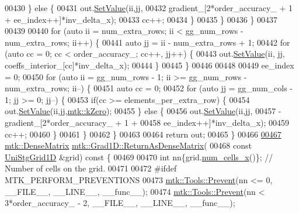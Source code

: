 \begin{DoxyCode}
{{00430       \} \textcolor{keywordflow}{else} \{
00431         out.\hyperlink{classmtk_1_1DenseMatrix_a784ce5784109ac86bfb9d8562b334b13}{SetValue}(ii,jj,
00432                      gradient\_[2*order\_accuracy\_ + 1 + ee\_index++]*inv\_delta\_x);
00433         cc++;
00434       \}
00435     \}
00436   \}
00437 
00439 
00440   \textcolor{keywordflow}{for} (\textcolor{keyword}{auto} ii = num\_extra\_rows; ii < gg\_num\_rows - num\_extra\_rows; ii++) \{
00441     \textcolor{keyword}{auto} jj = ii - num\_extra\_rows + 1;
00442     \textcolor{keywordflow}{for} (\textcolor{keyword}{auto} cc = 0; cc < order\_accuracy\_; cc++, jj++) \{
00443       out.\hyperlink{classmtk_1_1DenseMatrix_a784ce5784109ac86bfb9d8562b334b13}{SetValue}(ii, jj, coeffs\_interior\_[cc]*inv\_delta\_x);
00444     \}
00445   \}
00446 
00448 
00449   ee\_index = 0;
00450   \textcolor{keywordflow}{for} (\textcolor{keyword}{auto} ii = gg\_num\_rows - 1; ii >= gg\_num\_rows - num\_extra\_rows; ii--) \{
00451     \textcolor{keyword}{auto} cc = 0;
00452     \textcolor{keywordflow}{for} (\textcolor{keyword}{auto} jj = gg\_num\_cols - 1; jj >= 0; jj--) \{
00453       \textcolor{keywordflow}{if}(cc >= elements\_per\_extra\_row) \{
00454         out.\hyperlink{classmtk_1_1DenseMatrix_a784ce5784109ac86bfb9d8562b334b13}{SetValue}(ii,jj,\hyperlink{group__c01-roots_ga59a451a5fae30d59649bcda274fea271}{mtk::kZero});
00455       \} \textcolor{keywordflow}{else} \{
00456         out.\hyperlink{classmtk_1_1DenseMatrix_a784ce5784109ac86bfb9d8562b334b13}{SetValue}(ii,jj,
00457                      -gradient\_[2*order\_accuracy\_ + 1 +
00458 ee\_index++]*inv\_delta\_x);
00459         cc++;
00460       \}
00461      \}
00462   \}
00463 
00464   \textcolor{keywordflow}{return} out;
00465 \}
00466 
\hypertarget{mtk__grad__1d_8cc_source_l00467}{}\hyperlink{classmtk_1_1Grad1D_a871a3b31e257b04d5e303b3211df3a73}{00467} \hyperlink{classmtk_1_1DenseMatrix}{mtk::DenseMatrix} \hyperlink{classmtk_1_1Grad1D_a77b2eddbe4ab03f469306c604d505b1a}{mtk::Grad1D::ReturnAsDenseMatrix}(
00468   \textcolor{keyword}{const} \hyperlink{classmtk_1_1UniStgGrid1D}{UniStgGrid1D} &grid)\textcolor{keyword}{ const }\{
00469 
00470   \textcolor{keywordtype}{int} nn\{grid.\hyperlink{classmtk_1_1UniStgGrid1D_af1b3729d8afa07be5b2775ed68015b80}{num\_cells\_x}()\}; \textcolor{comment}{// Number of cells on the grid.}
00471 
00472 \textcolor{preprocessor}{  #ifdef MTK\_PERFORM\_PREVENTIONS}
00473   \hyperlink{classmtk_1_1Tools_a332324c6f25e66be9dff48c5987a3b9f}{mtk::Tools::Prevent}(nn <= 0, \_\_FILE\_\_, \_\_LINE\_\_, \_\_func\_\_);
00474   \hyperlink{classmtk_1_1Tools_a332324c6f25e66be9dff48c5987a3b9f}{mtk::Tools::Prevent}(nn < 3*order\_accuracy\_ - 2, \_\_FILE\_\_, \_\_LINE\_\_, \_\_func\_\_);
}}
\end{DoxyCode}
